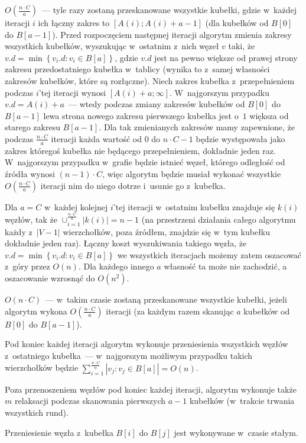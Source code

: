 \begin{myitemize}
	\item $O \left( \frac{n \cdot C}{a} \right)$~--- tyle razy zostaną przeskanowane wszystkie kubełki, gdzie w~każdej iteracji $i$ ich łączny zakres to $\left [ A \left( i \right) ; A \left( i \right) + a - 1 \right]$ (dla kubełków od $B \left[ 0 \right]$ do $B \left[ a - 1 \right]$).
	Przed rozpoczęciem następnej iteracji algorytm zmienia zakresy wszystkich kubełków, wyszukując w~ostatnim z~nich węzeł $v$ taki, że $v.d = \min \left\{ v_{i}.d : v_{i} \in B \left[ a \right] \right\}$, gdzie $v.d$ jest na pewno większe od prawej strony zakresu przedostatniego kubełka w~tablicy (wynika to z~samej własności zakresów kubełków, które są rozłączne).
	Niech zakres kubełka z~przepełnieniem podczas $i$'tej iteracji wynosi $\left [ A \left( i \right) + a; \infty \right]$.
	W~najgorszym przypadku $v.d = A \left( i \right) + a$~--- wtedy podczas zmiany zakresów kubełków od $B \left[ 0 \right]$ do $B \left[ a -1 \right]$ lewa strona nowego zakresu pierwszego kubełka jest o~$1$ większa od starego zakresu $B \left[ a -1 \right]$.
	Dla tak zmienianych zakresów mamy zapewnione, że podczas $\frac{n \cdot C}{a}$ iteracji każda wartość od $0$ do $n \cdot C - 1$ będzie występowała jako zakres któregoś kubełka nie będącego przepełnieniem, dokładnie jeden raz.
	W~najgorszym przypadku w~grafie będzie istnieć węzeł, którego odległość od źródła wynosi $\left( n - 1 \right) \cdot C$, więc algorytm będzie musiał wykonać wszystkie $O \left( \frac{n \cdot C}{a} \right)$ iteracji nim do niego dotrze i~usunie go z~kubełka.
	\item Dla $a=C$ w~każdej kolejnej $i$'tej iteracji w~ostatnim kubełku znajduje się $k \left( i \right)$ węzłów, tak że $\cup _{i = 1}^{\frac{n \cdot C}{a}} \left| k \left( i \right) \right| = n - 1$ (na przestrzeni działania całego algorytmu każdy z~$\left| V - 1 \right|$ wierzchołków, poza źródłem, znajdzie się w~tym kubełku dokładnie jeden raz).
	Łączny koszt wyszukiwania takiego węzła, że $v.d = \min \left\{ v_{i}.d : v_{i} \in B \left[ a \right] \right\}$ we wszystkich iteracjach możemy zatem oszacować z~góry przez $O \left( n \right)$.
	Dla każdego innego $a$ własność ta może nie zachodzić, a oszacowanie wzrosnąć do $O \left( n^{2} \right)$.
	\item $O \left( n \cdot C \right)$~--- w~takim czasie zostaną przeskanowane wszystkie kubełki, jeżeli algorytm wykona $O \left( \frac{n \cdot C}{a} \right)$ iteracji (za każdym razem skanując $a$ kubełków od $B \left[ 0 \right]$ do $B \left[ a - 1 \right]$).
	\item Pod koniec każdej iteracji algorytm wykonuje przeniesienia wszystkich węzłów z~ostatniego kubełka~--- w~najgorszym możliwym przypadku takich wierzchołków będzie $ \sum_{i=1}^{\frac{n \cdot C}{a}} \left| v_{j} : v_{j} \in B \left[ a \right] \right| = O \left( n \right)$.
	\item Poza przenoszeniem węzłów pod koniec każdej iteracji, algorytm wykonuje także $m$ relaksacji podczas skanowania pierwszych $a-1$ kubełków (w~trakcie trwania wszystkich rund).
	\item Przeniesienie węzła z~kubełka $B \left[ i \right]$ do $B \left[ j \right]$ jest wykonywane w~czasie stałym.
\end{myitemize}

